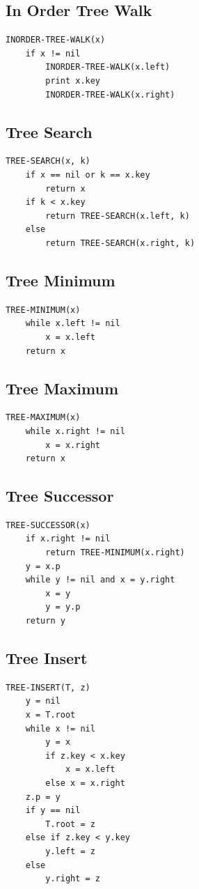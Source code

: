 \documentclass[10pt,a4paper]{article}
\begin{document}
\begin{multicols*}{2}
\subsection*{In Order Tree Walk}
\begin{lstlisting}
INORDER-TREE-WALK(x)
    if x != nil
        INORDER-TREE-WALK(x.left)
        print x.key
        INORDER-TREE-WALK(x.right)
\end{lstlisting}
\subsection*{Tree Search}
\begin{lstlisting}
TREE-SEARCH(x, k)
    if x == nil or k == x.key
        return x
    if k < x.key
        return TREE-SEARCH(x.left, k)
    else
        return TREE-SEARCH(x.right, k)
\end{lstlisting}
\subsection*{Tree Minimum}
\begin{lstlisting}
TREE-MINIMUM(x)
    while x.left != nil
        x = x.left
    return x
\end{lstlisting}
\subsection*{Tree Maximum}
\begin{lstlisting}
TREE-MAXIMUM(x)
    while x.right != nil
        x = x.right
    return x
\end{lstlisting}
\subsection*{Tree Successor}
\begin{lstlisting}
TREE-SUCCESSOR(x)
    if x.right != nil
        return TREE-MINIMUM(x.right)
    y = x.p
    while y != nil and x = y.right
        x = y
        y = y.p
    return y
\end{lstlisting}
\subsection*{Tree Insert}
\begin{lstlisting}
TREE-INSERT(T, z)
    y = nil
    x = T.root
    while x != nil
        y = x
        if z.key < x.key
            x = x.left
        else x = x.right
    z.p = y
    if y == nil
        T.root = z
    else if z.key < y.key
        y.left = z
    else
        y.right = z
\end{lstlisting}

\end{multicols*}
\end{document}

